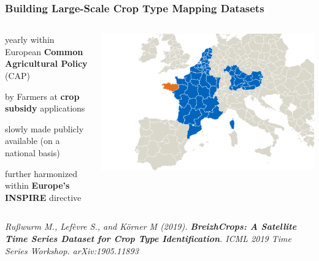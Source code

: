 \documentclass[%
  aspectratio=169,
  9pt,
  USenglish,
  titlegraphic, %
  affiliationintitlepagehead,
  progressbar,
]{beamer}
\begin{document}
\begin{frame}
\frametitle{Building Large-Scale Crop Type Mapping Datasets}

\begin{columns}
	
	
	\Large
	
	\begin{description}\setlength\itemsep{1em}
		\item[\color{tumblue}collected] yearly within European \textbf{Common Agricultural Policy} (CAP)
		\item[\color{tumblue}declared] by Farmers at \textbf{crop subsidy} applications
		\item[\color{tumblue}today] slowly made publicly available (on a national basis)
		\item[\color{tumblue}in future] further harmonized within \textbf{Europe's INSPIRE} directive
	\end{description}
	
	\includegraphics[width=\textwidth]{images/europe_data2}
	
	

	
\end{columns}

\vspace{2em}

	\small\raggedright
\textsl{
	Rußwurm M., Lefèvre S., and Körner M (2019). \textbf{BreizhCrops: A Satellite Time Series Dataset for Crop Type Identification}. ICML 2019 Time Series Workshop. arXiv:1905.11893
}

\end{frame}
\end{document}
